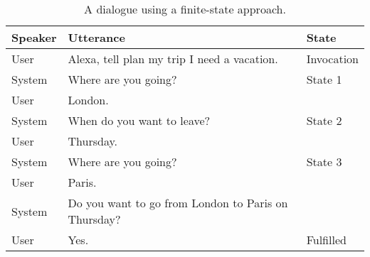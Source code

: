 \begin{table}[htbp]
\begin{center}
\begin{tabular}{p{2cm}p{5cm}p{3cm}}
Speaker & Utterance                                          & State      \\
\hline
User   & Alexa, tell plan my trip I need a vacation.         & Invocation \\
System & Where are you going?                                & State 1    \\
User   & London.                                             &            \\
System & When do you want to leave?                          & State 2    \\
User   & Thursday.                                           &            \\
System & Where are you going?                                & State 3    \\
User   & Paris.                                              &            \\
System & Do you want to go from London to Paris on Thursday? &            \\
User   & Yes.                                                & Fulfilled 
\end{tabular}
\caption{A dialogue using a finite-state approach.}
\end{center}
\end{table}